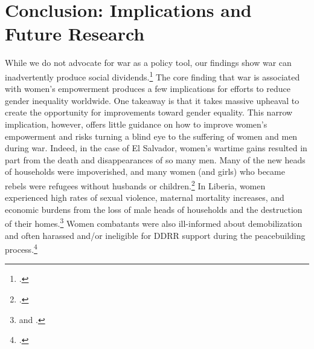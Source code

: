 \documentclass [12pt] {article}
\begin{document}
\section*{Conclusion: Implications and Future Research}
\vspace*{.2in}

While we do not advocate for war as a policy tool, our findings show war can inadvertently produce social dividends.\footnote{.} The core finding that war is associated with women's empowerment produces a few implications for efforts to reduce gender inequality worldwide. One takeaway is that it takes massive upheaval to create the opportunity for improvements toward gender equality. This narrow implication, however, offers little guidance on how to improve women's empowerment and risks turning a blind eye to the suffering of women and men during war. Indeed, in the case of El Salvador, women's wartime gains resulted in part from the death and disappearances of so many men. Many of the new heads of households were impoverished, and many women (and girls) who became rebels were refugees without husbands or children.\footnote{\citealt{wood2008social}.}  In Liberia, women experienced high rates of sexual violence, maternal mortality increases, and economic burdens from the loss of male heads of households and the destruction of their homes.\footnote{ and .}  Women combatants were also ill-informed about demobilization and often harassed and/or ineligible for DDRR support during the peacebuilding process.\footnote{.}\\
\end{document}
